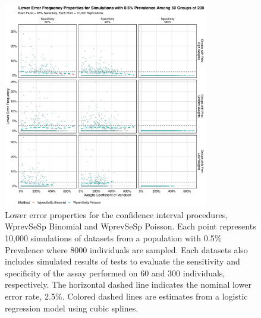 \documentclass[AMA,STIX1COL]{WileyNJD-v2}
\begin{document}
\begin{figure}
\centering
\includegraphics[width=0.8\textwidth]{figures/imperfect_lower_error_frequency_50_groups_0_005_prev.pdf}
\caption{Lower error properties for the confidence interval procedures, WprevSeSp Binomial and WprevSeSp Poisson.
Each point represents 10,000 simulations of datasets from a population with 0.5\% Prevalence where 8000 individuals are sampled.
Each datasets also includes simulated results of tests to evaluate the sensitivity and specificity of the assay performed on 60 and 300 individuals, respectively.
The horizontal dashed line indicates the nominal lower error rate, 2.5\%.
Colored dashed lines are estimates from a logistic regression model using cubic splines.}
\label{fig:imperfect_lower_error_frequency_50_groups_0_005_prev}
\end{figure}
\end{document}
